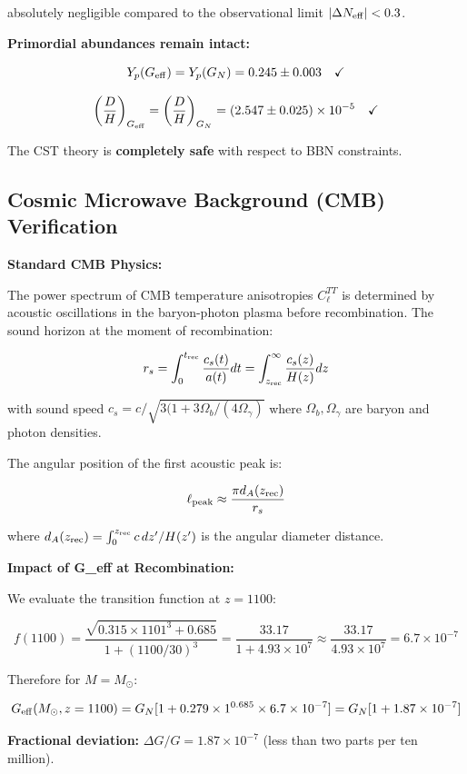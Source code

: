 \documentclass[11pt,a4paper]{article}
\begin{document}
absolutely negligible compared to the observational limit
\(|\Delta N_{\rm eff}| < 0.3\).

\textbf{Primordial abundances remain intact:}

\[Y_p(G_{\rm eff}) = Y_p(G_N) = 0.245 \pm 0.003 \quad \checkmark\]

\[\left(\frac{D}{H}\right)_{G_{\rm eff}} = \left(\frac{D}{H}\right)_{G_N} = (2.547 \pm 0.025) \times 10^{-5} \quad \checkmark\]

The CST theory is \textbf{completely safe} with respect to BBN
constraints.

\hypertarget{cosmic-microwave-background-cmb-verification}{%
\subsection{Cosmic Microwave Background (CMB)
Verification}\label{cosmic-microwave-background-cmb-verification}}

\textbf{Standard CMB Physics:}

The power spectrum of CMB temperature anisotropies \(C_\ell^{TT}\) is
determined by acoustic oscillations in the baryon-photon plasma before
recombination. The sound horizon at the moment of recombination:

\[r_s = \int_0^{t_{\rm rec}} \frac{c_s(t)}{a(t)} dt = \int_{z_{\rm rec}}^\infty \frac{c_s(z)}{H(z)} dz\]

with sound speed \(c_s = c/\sqrt{3(1 + 3\Omega_b/(4\Omega_\gamma)}\)
where \(\Omega_b, \Omega_\gamma\) are baryon and photon densities.

The angular position of the first acoustic peak is:

\[\ell_{\rm peak} \approx \frac{\pi d_A(z_{\rm rec})}{r_s}\]

where \(d_A(z_{\rm rec}) = \int_0^{z_{\rm rec}} c\, dz'/H(z')\) is the
angular diameter distance.

\textbf{Impact of G\_eff at Recombination:}

We evaluate the transition function at \(z = 1100\):

\[f(1100) = \frac{\sqrt{0.315 \times 1101^3 + 0.685}}{1 + (1100/30)^3} = \frac{33.17}{1 + 4.93\times10^7} \approx \frac{33.17}{4.93\times10^7} = 6.7 \times 10^{-7}\]

Therefore for \(M = M_\odot\):

\[G_{\rm eff}(M_\odot, z=1100) = G_N [1 + 0.279 \times 1^{0.685} \times 6.7\times10^{-7}] = G_N [1 + 1.87\times10^{-7}]\]

\textbf{Fractional deviation:} \(\Delta G/G = 1.87 \times 10^{-7}\)
(less than two parts per ten million).
\end{document}
